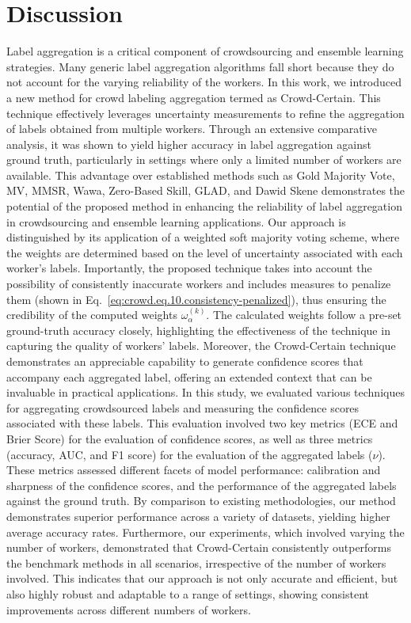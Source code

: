 \documentclass[default]{bst/sn-jnl_mine}%
\begin{document}
\section{Discussion}\label{sec:crowd.discussion}
Label aggregation is a critical component of crowdsourcing and ensemble learning strategies. Many generic label aggregation algorithms fall short because they do not account for the varying reliability of the workers. In this work, we introduced a new method for crowd labeling aggregation termed as Crowd-Certain. This technique effectively leverages uncertainty measurements to refine the aggregation of labels obtained from multiple workers. Through an extensive comparative analysis, it was shown to yield higher accuracy in label aggregation against ground truth, particularly in settings where only a limited number of workers are available. This advantage over established methods such as Gold Majority Vote, MV, MMSR, Wawa, Zero-Based Skill, GLAD, and Dawid Skene demonstrates the potential of the proposed method in enhancing the reliability of label aggregation in crowdsourcing and ensemble learning applications.
Our approach is distinguished by its application of a weighted soft majority voting scheme, where the weights are determined based on the level of uncertainty associated with each worker's labels. Importantly, the proposed technique takes into account the possibility of consistently inaccurate workers and includes measures to penalize them (shown in Eq.~\ref{eq:crowd.eq.10.consistency-penalized}), thus ensuring the credibility of the computed weights $\omega_{\alpha}^{(k)}$. The calculated weights follow a pre-set ground-truth accuracy closely, highlighting the effectiveness of the technique in capturing the quality of workers' labels. Moreover, the Crowd-Certain technique demonstrates an appreciable capability to generate confidence scores that accompany each aggregated label, offering an extended context that can be invaluable in practical applications.
In this study, we evaluated various techniques for aggregating crowdsourced labels and measuring the confidence scores associated with these labels. This evaluation involved two key metrics (ECE and Brier Score) for the evaluation of confidence scores, as well as three metrics (accuracy, AUC, and F1 score) for the evaluation of the aggregated labels ($\nu$). These metrics assessed different facets of model performance: calibration and sharpness of the confidence scores, and the performance of the aggregated labels against the ground truth. By comparison to existing methodologies, our method demonstrates superior performance across a variety of datasets, yielding higher average accuracy rates. Furthermore, our experiments, which involved varying the number of workers, demonstrated that Crowd-Certain consistently outperforms the benchmark methods in all scenarios, irrespective of the number of workers involved. This indicates that our approach is not only accurate and efficient, but also highly robust and adaptable to a range of settings, showing consistent improvements across different numbers of workers.
\end{document}
